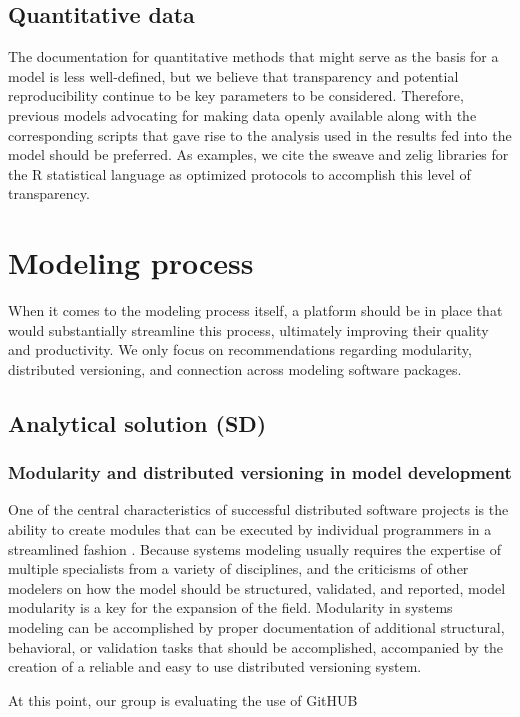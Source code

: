 \documentclass[11pt]{article}
\begin{document}
\subsection {Quantitative data}
The documentation for quantitative methods that might serve as the basis for a model is less well-defined, but we believe that transparency and potential reproducibility continue to be key parameters to be considered.  Therefore, previous models advocating for making data openly available along with the corresponding scripts that gave rise to the analysis used in the results fed into the model should be preferred.  As examples, we cite the sweave \cite{LEISCH2002} and zelig \cite{IMAI2006} libraries for the R statistical language \cite{r-project} as optimized protocols to accomplish this level of transparency. 

\section {Modeling process}
When it comes to the modeling process itself, a platform should be in place that would substantially streamline this process, ultimately improving their quality and productivity.  We only focus on recommendations regarding modularity, distributed versioning, and connection across modeling software packages.

\subsection {Analytical solution (SD)}
\subsubsection {Modularity and distributed versioning in model development}
One of the central characteristics of successful distributed software projects is the ability to create modules that can be executed by individual programmers in a streamlined fashion \cite{Moon2000}.  Because systems modeling usually requires the expertise of multiple specialists from a variety of disciplines, and the criticisms of other modelers on how the model should be structured, validated, and reported, model modularity is a key for the expansion of the field.  Modularity in systems modeling can be accomplished by proper documentation of additional structural, behavioral, or validation tasks that should be accomplished, accompanied by the creation of a reliable and easy to use distributed versioning system.

At this point, our group is evaluating the use of GitHUB
\end{document}
